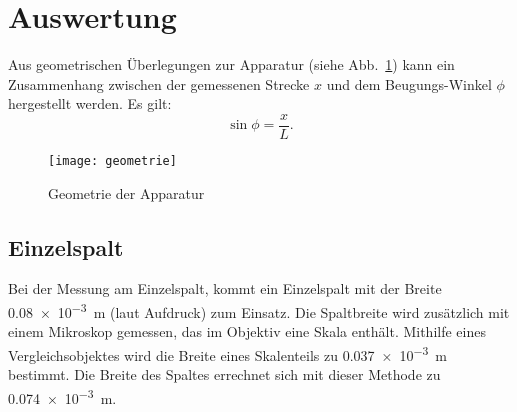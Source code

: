 
\section{Auswertung}


Aus geometrischen Überlegungen zur Apparatur (siehe 
Abb.~\ref{fig:apparatur-geometrie}) kann ein Zusammenhang zwischen der
gemessenen Strecke $x$ und dem Beugungs-Winkel $\phi$ hergestellt
werden. Es gilt:
%
\begin{equation}
  \label{eq:x-phi}
  \sin\phi = \frac{x}{L}\text{.}
\end{equation}

\begin{figure}[b]
  \centering
  \texttt{[image: geometrie]}
  \caption{Geometrie der Apparatur}
  \label{fig:apparatur-geometrie}
\end{figure}

\subsection{Einzelspalt}

Bei der Messung am Einzelspalt, kommt ein Einzelspalt mit der Breite
\SI{0.08e-3}{\metre} (laut Aufdruck) zum Einsatz. Die Spaltbreite wird
zusätzlich mit einem Mikroskop gemessen, das im Objektiv eine Skala
enthält. Mithilfe eines Vergleichsobjektes wird die Breite eines
Skalenteils zu \SI{0.037e-3}{\metre} bestimmt. Die Breite des Spaltes
errechnet sich mit dieser Methode zu \SI{0.074e-3}{\metre}. 

